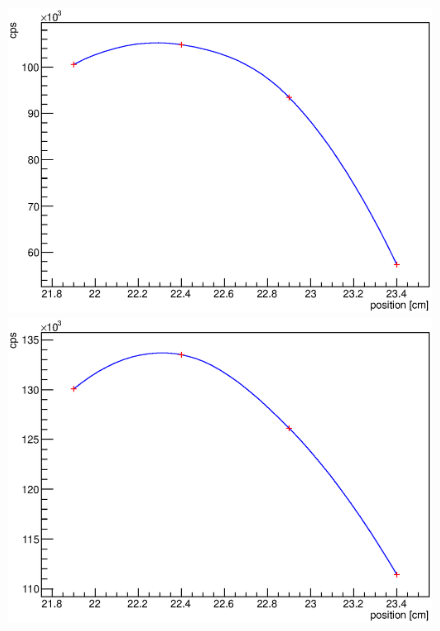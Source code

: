 \begin{figure}
\begin{minipage}[d]{0.24 \textwidth}
		  \includegraphics[width=\textwidth]{graphics/cobalt/modules/6A.eps}
	\end{minipage}
	\begin{minipage}[d]{0.24 \textwidth}
		  \includegraphics[width=\textwidth]{graphics/cobalt/modules/6B.eps}
	\end{minipage}\newline
	

\end{figure}
